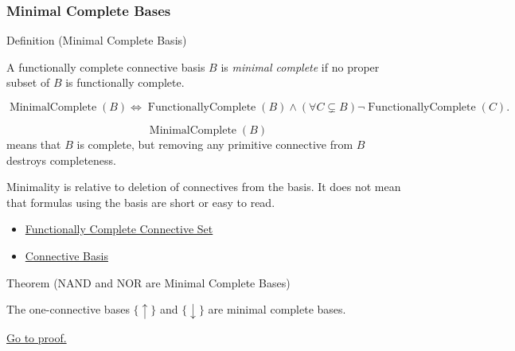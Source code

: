 \subsubsection*{Minimal Complete Bases}

\begin{definitionbox}{Definition (Minimal Complete Basis)}
\begin{definition}
\label{def:minimal-complete-basis-propositional-logic}
A functionally complete connective basis \(B\) is \emph{minimal complete} if no
proper subset of \(B\) is functionally complete.
\end{definition}
\end{definitionbox}

\begin{remark*}
\[
\operatorname{MinimalComplete}(B)
\Longleftrightarrow
\operatorname{FunctionallyComplete}(B)
\land
(\forall C\subsetneq B)\neg\operatorname{FunctionallyComplete}(C).
\]
\end{remark*}

\begin{remark*}
\[
  \operatorname{MinimalComplete}(B)
\] means that \(B\) is complete, but removing
any primitive connective from \(B\) destroys completeness.
\end{remark*}

\begin{remark*}[Interpretation]
Minimality is relative to deletion of connectives from the basis. It does not
mean that formulas using the basis are short or easy to read.
\end{remark*}

\begin{dependencies}
\begin{itemize}
  \item \hyperref[def:functionally-complete-connective-set-propositional-logic]{Functionally Complete Connective Set}
  \item \hyperref[def:connective-basis-propositional-logic]{Connective Basis}
\end{itemize}
\end{dependencies}

\begin{theorembox}{Theorem (NAND and NOR are Minimal Complete Bases)}
\begin{theorem}
\label{thm:nand-nor-minimal-complete-bases-propositional-logic}
The one-connective bases \(\{\uparrow\}\) and \(\{\downarrow\}\) are minimal
complete bases.

\noindent\hyperref[prf:nand-nor-minimal-complete-bases-propositional-logic]{Go to proof.}
\end{theorem}
\end{theorembox}


